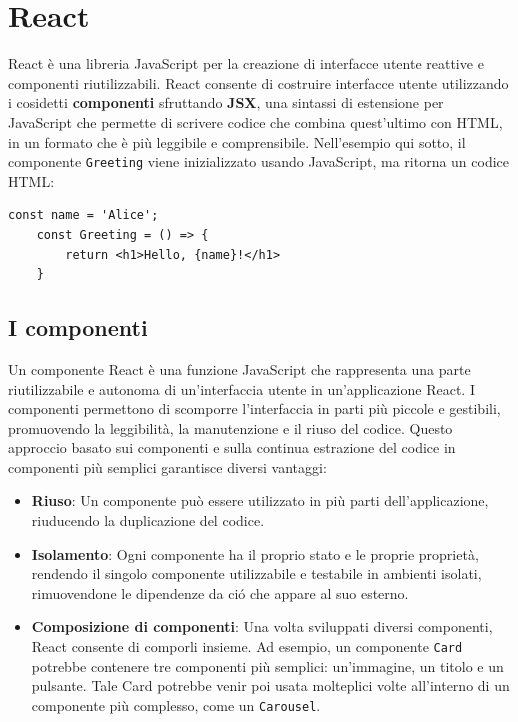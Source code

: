 \documentclass[target=bach,aauheader=,style=]{thud}
\begin{document}
\section{React}
React è una libreria JavaScript per la creazione di interfacce utente reattive e componenti riutilizzabili. React consente di costruire interfacce utente utilizzando i cosidetti \textbf{componenti} sfruttando \textbf{JSX}, una sintassi di estensione per JavaScript che permette di scrivere codice che combina quest'ultimo con HTML, in un formato che è più leggibile e comprensibile. Nell'esempio qui sotto,  il componente \texttt{Greeting} viene inizializzato usando JavaScript, ma ritorna un codice HTML:

\begin{lstlisting}[caption=Esempio di codice React]
    const name = 'Alice';   
    const Greeting = () => {
        return <h1>Hello, {name}!</h1>
    } 
\end{lstlisting}

\subsection{I componenti}
Un componente React è una funzione JavaScript che rappresenta una parte riutilizzabile e autonoma di un'interfaccia utente in un'applicazione React. I componenti permettono di scomporre l'interfaccia in parti più piccole e gestibili, promuovendo la leggibilità, la manutenzione e il riuso del codice. Questo approccio basato sui componenti e sulla continua estrazione del codice in componenti più semplici garantisce diversi vantaggi:

\begin{itemize}
    \item \textbf{Riuso}: Un componente può essere utilizzato in più parti dell'applicazione, riuducendo la duplicazione del codice.
    \item \textbf{Isolamento}: Ogni componente ha il proprio stato e le proprie proprietà, rendendo il singolo componente utilizzabile e testabile in ambienti isolati, rimuovendone le dipendenze da ció che appare al suo esterno.
    \item \textbf{Composizione di componenti}: Una volta sviluppati diversi componenti, React consente di comporli insieme. Ad esempio, un componente \texttt{Card} potrebbe contenere tre componenti più semplici: un'immagine, un titolo e un pulsante. Tale Card potrebbe venir poi usata molteplici volte all'interno di un componente più complesso, come un \texttt{Carousel}.
\end{itemize}
\end{document}
